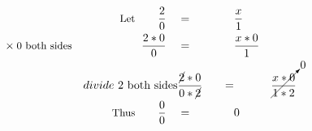 \begin{alignat*}{5}
&\,&\small\text{Let}\normalsize\qquad\frac{2}{0}\quad&=\quad&&\frac{x}{1}\\
&\times\small\text{0 both sides}&\frac{2*0}{0}\quad&=&&\frac{x*0}{1}\\
&\,\small &divide\text{ 2 both sides}&\frac{\cancel{2}*0}{0*\cancel{2}}\quad&=&&\cancelto{0}{\frac{x*0}{1*2}}\\
&\,&\small\text{Thus}\normalsize\qquad\frac{0}{0}\quad&=&&0
\end{alignat*}
